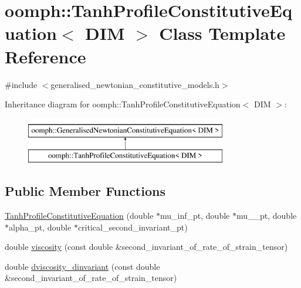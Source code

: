 \hypertarget{classoomph_1_1TanhProfileConstitutiveEquation}{}\section{oomph\+:\+:Tanh\+Profile\+Constitutive\+Equation$<$ D\+IM $>$ Class Template Reference}
\label{classoomph_1_1TanhProfileConstitutiveEquation}


{\ttfamily \#include $<$generalised\+\_\+newtonian\+\_\+constitutive\+\_\+models.\+h$>$}

Inheritance diagram for oomph\+:\+:Tanh\+Profile\+Constitutive\+Equation$<$ D\+IM $>$\+:\begin{figure}[H]
\begin{center}
\leavevmode
\includegraphics[height=2.000000cm]{classoomph_1_1TanhProfileConstitutiveEquation}
\end{center}
\end{figure}
\subsection*{Public Member Functions}
\begin{DoxyCompactItemize}
\item 
\hyperlink{classoomph_1_1TanhProfileConstitutiveEquation_a18cb572bab5a87ab20220ad009ba82eb}{Tanh\+Profile\+Constitutive\+Equation} (double $\ast$mu\+\_\+inf\+\_\+pt, double $\ast$mu\+\_\+\_\+pt, double $\ast$alpha\+\_\+pt, double $\ast$critical\+\_\+second\+\_\+invariant\+\_\+pt)
\item 
double \hyperlink{classoomph_1_1TanhProfileConstitutiveEquation_aee5659a24ab4d18f4a90661113528ca3}{viscosity} (const double \&second\+\_\+invariant\+\_\+of\+\_\+rate\+\_\+of\+\_\+strain\+\_\+tensor)
\item 
double \hyperlink{classoomph_1_1TanhProfileConstitutiveEquation_a5151261b6ec1c3f29f7ee085db955c2f}{dviscosity\+\_\+dinvariant} (const double \&second\+\_\+invariant\+\_\+of\+\_\+rate\+\_\+of\+\_\+strain\+\_\+tensor)
\end{DoxyCompactItemize}
